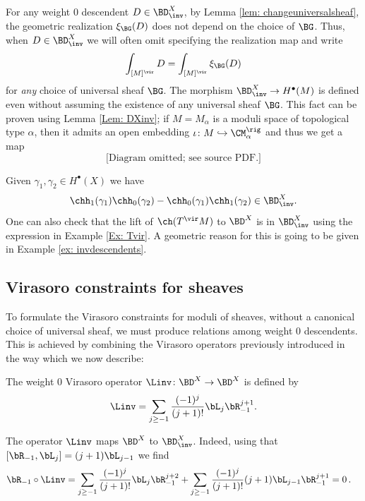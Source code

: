 For any weight 0 descendent $D\in \BD^X_{\inv}$, by Lemma \ref{lem: changeuniversalsheaf}, the geometric realization $\xi_{\BG}(D)$ does not depend on the choice of $\BG$. Thus, when $D\in \BD^X_{\inv}$ we will often omit specifying the realization map and write
\[\int_{[M]^\vir} D=\int_{[M]^\vir}\xi_{\BG}(D)\]
for \emph{any} choice of universal sheaf $\BG$.
The morphism $\BD^X_{\inv}\to H^\bullet(M)$ is defined even without assuming the existence of any universal sheaf $\BG$. This fact can be proven using Lemma \ref{Lem: DXinv}; if $M=M_\alpha$ is a moduli space of topological type $\alpha$, then it admits an open embedding $\iota\colon M\hookrightarrow \CM_\alpha^\rig$ and thus we get a map
\[\text{[Diagram omitted; see source PDF.]}\]

\begin{example}
\notready\label{Ex: DXinvdescendents}
Given $\gamma_1,\gamma_2\in H^\bullet(X)$ we have
\[\chh_1(\gamma_1)\chh_0(\gamma_2)-\chh_0(\gamma_1)\chh_1(\gamma_2)\in \BD^X_{\inv}.\]
One can also check that the lift of $\ch(T^\vir M)$ to $\BD^X$ is in $\BD^X_{\inv}$ using the expression in Example \ref{Ex: Tvir}. A geometric reason for this is going to be given in Example \ref{ex: invdescendents}.
\end{example}



\subsection{Virasoro constraints for sheaves}
\label{sec: virasorosheaves}

To formulate the Virasoro constraints for moduli of sheaves, without a canonical choice of universal sheaf, we must produce relations among weight 0 descendents. This is achieved by combining the Virasoro operators previously introduced in the way which we now describe:
\begin{definition}
\notready\label{def: Linv}
The weight 0 Virasoro operator $\Linv \colon \BD^X\to \BD^X$ is defined by
\[\Linv=\sum_{j\geq -1}\frac{(-1)^j}{(j+1)!}\bL_j \bR_{-1}^{j+1}.\]
\end{definition}

The operator $\Linv$ maps $\BD^X$ to $\BD^X_{\inv}$. Indeed, using that $[\bR_{-1}, \bL_j]=(j+1)\bL_{j-1}$ we find
\begin{align*}
    \bR_{-1}\circ \Linv &=\sum_{j\geq -1}\frac{(-1)^j}{(j+1)!}\bL_j \bR_{-1}^{j+2}+\sum_{j\geq -1}\frac{(-1)^j}{(j+1)!}(j+1)\bL_{j-1} \bR_{-1}^{j+1}=0\,.
\end{align*}

